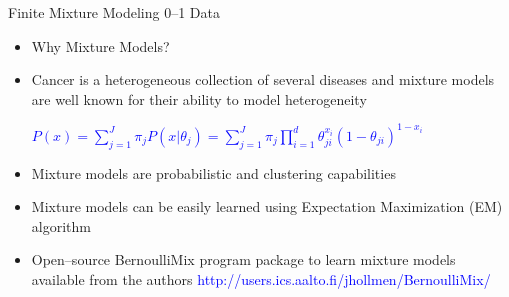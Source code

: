 \documentclass[first=dgreen,second=purple,logo=redexc]{aaltoslides}
\begin{document}

\begin{frame} {Finite Mixture Modeling 0--1 Data} 
\small
\begin{itemize}\setlength{\itemsep}{4mm}
    \item {\color{red} {Why Mixture Models?}}
    \item Cancer is a heterogeneous collection of several diseases and mixture models are well known for their ability to model heterogeneity
    
     \vspace{0.1cm}  
\textcolor{blue} { $ P(x) = \sum _{j=1}^{J} \pi _{j} P(x|\theta _{j}) = \sum _{j=1}^{J} \pi _{j} \prod _{i=1}^{d} \theta_{ji}^{x_i}(1-\theta _{ji})^{1-x_{i}}$ } \\
      \vspace{0.1cm}    
    
    \item Mixture models are probabilistic and clustering capabilities 
    \item Mixture models can be easily learned using Expectation Maximization (EM) algorithm  
    \item Open--source BernoulliMix program package to learn mixture models available from the authors \textcolor{blue}{http://users.ics.aalto.fi/jhollmen/BernoulliMix/}
\end{itemize}
\end{frame}


\end{document}
